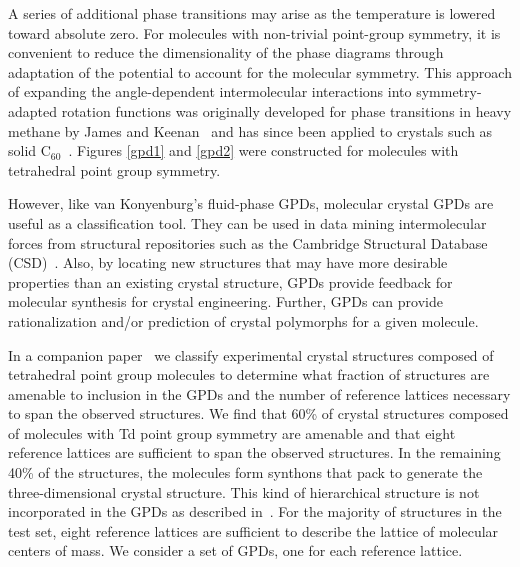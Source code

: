 \documentclass[preprint]{iucr}              %
\begin{document}
A series of additional phase transitions may arise as the
temperature is lowered toward absolute zero. For molecules with non-trivial
point-group symmetry, it is convenient to reduce the dimensionality of the phase
diagrams through adaptation of the potential to account for the molecular
symmetry. This approach of expanding the angle-dependent intermolecular
interactions into symmetry-adapted rotation functions was originally developed
for phase transitions in heavy methane by James and Keenan~\cite{James59} and
has since been applied to crystals such as solid
C$_{60}$~\cite{Michel92,Lamoen99}.  Figures \ref{gpd1} and \ref{gpd2} were
constructed for molecules with tetrahedral point group symmetry.

However, like van Konyenburg's fluid-phase GPDs, molecular crystal
GPDs are useful as a classification tool.  They can be used in data mining intermolecular forces from
structural repositories such as the Cambridge Structural Database
(CSD)~\cite{Allen02}.  Also, by locating new structures that may have more
desirable properties than an existing
crystal structure, GPDs provide feedback for molecular synthesis for crystal engineering. Further, GPDs
can provide rationalization and/or prediction of crystal polymorphs for a given
molecule.

In a companion paper~\cite{McClurg09} we classify
experimental crystal structures composed of tetrahedral point group molecules to
determine what fraction of structures are amenable to inclusion in the GPDs and
the number of reference lattices necessary to span the observed structures.  We
find that 60\% of crystal structures composed of molecules with Td point group
symmetry are amenable and that eight reference lattices are sufficient to span
the observed structures.  In the remaining 40\% of the structures, the molecules
form synthons that pack to generate the three-dimensional crystal structure. 
This kind of hierarchical structure is not incorporated in the GPDs as described
in~\cite{Mettes04}.  For the majority of structures in the test set, eight
reference lattices are sufficient to describe the lattice of molecular centers
of mass.  We consider a set of GPDs, one for each reference lattice.  
\end{document}
